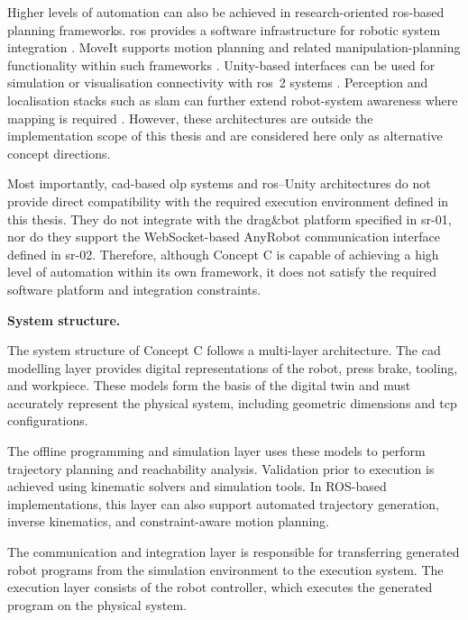 Higher levels of automation can also be achieved in research-oriented \ac{ros}-based planning frameworks. \ac{ros} provides a software infrastructure for robotic system integration \cite{quigley2009ros}. MoveIt supports motion planning and related manipulation-planning functionality within such frameworks \cite{Coleman2014MoveIt}. Unity-based interfaces can be used for simulation or visualisation connectivity with \ac{ros}~2 systems \cite{UnityROS2Docs}. Perception and localisation stacks such as \ac{slam} can further extend robot-system awareness where mapping is required \cite{Cadena2016SLAM}. However, these architectures are outside the implementation scope of this thesis and are considered here only as alternative concept directions.

Most importantly, \acs{cad}-based \acs{olp} systems and \acs{ros}--Unity architectures do not provide direct compatibility with the required execution environment defined in this thesis. They do not integrate with the drag\&bot platform specified in \acs{sr}-01, nor do they support the WebSocket-based AnyRobot communication interface defined in \acs{sr}-02. Therefore, although Concept C is capable of achieving a high level of automation within its own framework, it does not satisfy the required software platform and integration constraints.

\label{sec:concept-c-system-structure}
\noindent\textbf{System structure.}

The system structure of Concept C follows a multi-layer architecture. The \acs{cad} modelling layer provides digital representations of the robot, press brake, tooling, and workpiece. These models form the basis of the digital twin and must accurately represent the physical system, including geometric dimensions and \ac{tcp} configurations.

The offline programming and simulation layer uses these models to perform trajectory planning and reachability analysis. Validation prior to execution is achieved using kinematic solvers and simulation tools. In ROS-based implementations, this layer can also support automated trajectory generation, inverse kinematics, and constraint-aware motion planning.

The communication and integration layer is responsible for transferring generated robot programs from the simulation environment to the execution system. The execution layer consists of the robot controller, which executes the generated program on the physical system.

